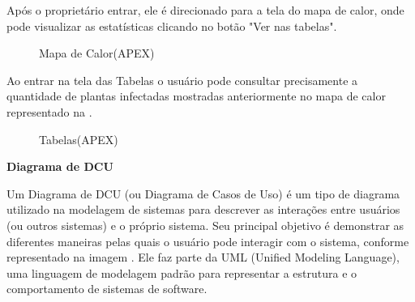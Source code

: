     Após o proprietário entrar, ele é direcionado para a tela do mapa de calor, onde pode visualizar as estatísticas clicando no botão "Ver nas tabelas". 

    
    \begin{figure}[H]
        \centering
        \caption{Mapa de Calor(APEX)}%
        \label{phot:pg-16}
    \end{figure}

    Ao entrar na tela das Tabelas o usuário pode consultar precisamente a quantidade de plantas infectadas mostradas anteriormente no mapa de calor representado na .

    \begin{figure}[H]
        \centering
        \caption{Tabelas(APEX)}%
        \label{phot:pg-17}
    \end{figure}


    \textbf{Diagrama de DCU} 

    Um Diagrama de DCU (ou Diagrama de Casos de Uso) é um tipo de diagrama utilizado na modelagem de sistemas para descrever as interações entre usuários (ou outros sistemas) e o próprio sistema. Seu principal objetivo é demonstrar as diferentes maneiras pelas quais o usuário pode interagir com o sistema, conforme representado na imagem . Ele faz parte da UML (Unified Modeling Language), uma linguagem de modelagem padrão para representar a estrutura e o comportamento de sistemas de software.

